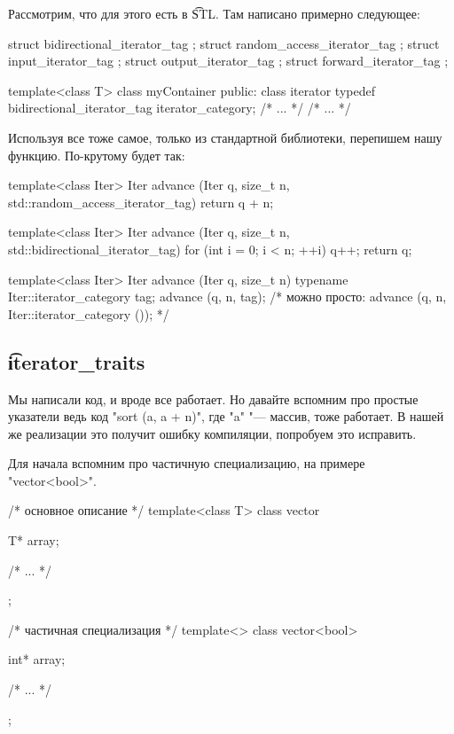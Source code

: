 Рассмотрим, что для этого есть в \t{STL}. 
Там написано примерно следующее:
\begin{cppcode}
struct bidirectional_iterator_tag {};
struct random_access_iterator_tag {};
struct input_iterator_tag {};
struct output_iterator_tag {};
struct forward_iterator_tag {};

template<class T> 
class myContainer {
public:
    class iterator {
        typedef bidirectional_iterator_tag iterator_category;
        /* ... */
    }
    /* ... */
}
\end{cppcode}

Используя все тоже самое, только из стандартной библиотеки, перепишем нашу функцию.
По-крутому будет так:
\begin{cppcode}
template<class Iter>
Iter advance (Iter q, size_t n, std::random_access_iterator_tag) {
    return q + n;
}

template<class Iter>
Iter advance (Iter q, size_t n, std::bidirectional_iterator_tag) {
    for (int i = 0; i < n; ++i)
        q++;
    return q;
} 

template<class Iter>
Iter advance (Iter q, size_t n) {
    typename Iter::iterator_category tag;
    advance (q, n, tag);
    /* можно просто: advance (q, n, Iter::iterator_category ()); */
}
\end{cppcode}

\subsection{\t{iterator\_traits}}
Мы написали код, и вроде все работает. 
Но давайте вспомним про простые указатели ведь код \cpp"sort (a, a + n)", где \cpp"a" "--- массив, тоже работает. 
В нашей же реализации это получит ошибку компиляции, попробуем это исправить.

Для начала вспомним про частичную специализацию, на примере \cpp"vector<bool>".
\begin{cppcode}
/* основное описание */
template<class T>
class vector {
    T* array;

    /* ... */
};

/* частичная специализация */
template<>
class vector<bool> {
    int* array;

    /* ... */
};
\end{cppcode}



